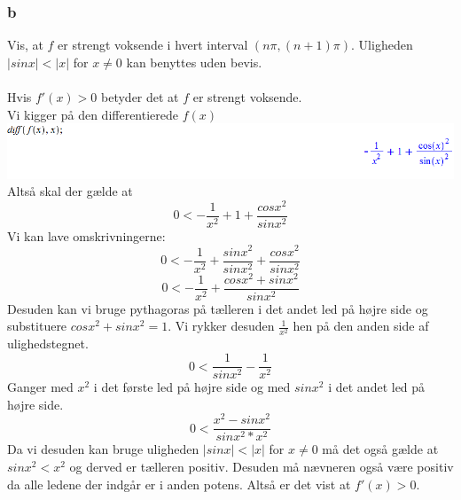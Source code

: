 \documentclass[12pt]{article}
\begin{document}
\subsubsection*{b}
Vis, at $f$ er strengt voksende i hvert interval $(n\pi,(n+1)\pi)$. Uligheden $|sinx|<|x|$ for $x\neq 0$ kan benyttes uden bevis.\\
\\
Hvis $f'(x)>0$ betyder det at $f$ er strengt voksende.\\
Vi kigger på den differentierede $f(x)$\\
\includegraphics[scale=0.6]{Pic6}\\
Altså skal der gælde at
$$0<-\frac{1}{x^2}+1+\frac{cosx^2}{sinx^2}$$
Vi kan lave omskrivningerne:
$$0<-\frac{1}{x^2}+\frac{sinx^2}{sinx^2}+\frac{cosx^2}{sinx^2}$$
$$0<-\frac{1}{x^2}+\frac{cosx^2+sinx^2}{sinx^2}$$
Desuden kan vi bruge pythagoras på tælleren i det andet led på højre side og substituere $cosx^2+sinx^2=1$. Vi rykker desuden $\frac{1}{x^2}$ hen på den anden side af ulighedstegnet.
$$0<\frac{1}{sinx^2}-\frac{1}{x^2}$$
Ganger med $x^2$ i det første led på højre side og med $sinx^2$ i det andet led på højre side.
$$0<\frac{x^2-sinx^2}{sinx^2*x^2}$$
Da vi desuden kan bruge uligheden $|sinx|<|x|$ for $x\neq 0$ må det også gælde at $sinx^2<x^2$ og derved er tælleren positiv. Desuden må nævneren også være positiv da alle ledene der indgår er i anden potens. Altså er det vist at $f'(x) > 0$.
\end{document}
